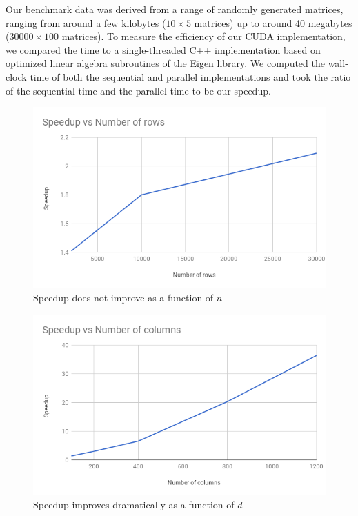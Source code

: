 \documentclass[12pt]{article}
\begin{document}
Our benchmark data was derived from a range of randomly generated matrices, ranging from around a few kilobytes ($10\times 5$ matrices) up to around 40 megabytes ($30000\times 100$ matrices). To measure the efficiency of our CUDA implementation, we compared the time to a single-threaded C++ implementation based on optimized linear algebra subroutines of the Eigen library. We computed the wall-clock time of both the sequential and parallel implementations and took the ratio of the sequential time and the parallel time to be our speedup. 

\begin{figure}[ht]
\centering
\label{speedup-vs-rows}
\includegraphics[scale=0.7]{speedup-vs-rows}
\caption{Speedup does not improve as a function of $n$}
\end{figure}

\begin{figure}[ht]
\centering
\label{speedup-vs-cols}
\includegraphics[scale=0.7]{speedup-vs-cols}
\caption{Speedup improves dramatically as a function of $d$}
\end{figure}
\end{document}
